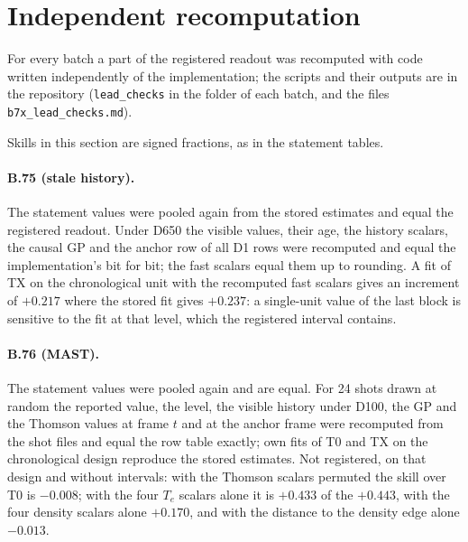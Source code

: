 \documentclass[11pt,a4paper]{article}
\newcommand{\Te}{\ensuremath{T_e}}
\begin{document}
\begin{table}[tbp]
  \centering
  \caption{\CapStatNotHeld}
  \label{tab:statnotheld}
  \TabStatNotHeld
\end{table}

\begin{table}[tbp]
  \centering
  \caption{\CapStatNotHeldB}
  \label{tab:statnotheldb}
  \TabStatNotHeldB
\end{table}

\begin{table}[tbp]
  \centering
  \caption{\CapStatNotHeldC}
  \label{tab:statnotheldc}
  \TabStatNotHeldC
\end{table}

\section{Independent recomputation}
\label{sec:schecks}

For every batch a part of the registered readout was recomputed with code written
independently of the implementation; the scripts and their outputs are in the repository
(\texttt{lead\_checks} in the folder of each batch, and the files
\texttt{b7x\_lead\_checks.md}).

Skills in this section are signed fractions, as in the statement tables.

\paragraph{B.75 (stale history).} The statement values were pooled again from the stored
estimates and equal the registered readout. Under D650 the visible values, their age, the
history scalars, the causal GP and the anchor row of all D1 rows were recomputed and equal
the implementation's bit for bit; the fast scalars equal them up to rounding. A fit of TX
on the chronological unit with the recomputed fast scalars gives an increment of $+0.217$
where the stored fit gives $+0.237$: a single-unit value of the last block is sensitive
to the fit at that level, which the registered interval contains.

\paragraph{B.76 (MAST).} The statement values were pooled again and are equal. For 24
shots drawn at random the reported value, the level, the visible history under D100, the
GP and the Thomson values at frame $t$ and at the anchor frame were recomputed from the
shot files and equal the row table exactly; own fits of T0 and TX on the chronological
design reproduce the stored estimates. Not registered, on that design and without
intervals: with the Thomson scalars permuted the skill over T0 is $-0.008$; with the four
\Te{} scalars alone it is $+0.433$ of the $+0.443$, with the four density scalars alone
$+0.170$, and with the distance to the density edge alone $-0.013$.
\end{document}

